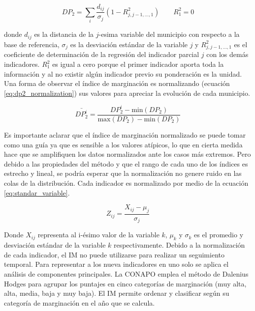 \begin{equation}
    DP_2 =  \sum_{i} \frac{d_{ij}}{\sigma_j} (1-R_{j,j-1,\dots,1}^2) \qquad R_1^2=0
    \label{eq:dp2_definition}
\end{equation}

donde $d_{ij}$ es la distancia de la $j$-esima variable del municipio con respecto a la base de referencia, $\sigma_j$ es la desviación estándar de la variable $j$ y $R_{j,j-1,\dots,1}^2$ es el coeficiente de determinación de la regresión del indicador parcial $j$ con los demás indicadores. $R_1^2$ es igual a cero porque el primer indicador aporta toda la información y al no existir algún indicador previo su ponderación es la unidad. Una forma de observar el índice de marginación es normalizando (ecuación \ref{eq:dp2_normalization}) sus valores para apreciar la evolución de cada municipio\cite{Somarriba_2013}.

\begin{equation}
    \bar{DP_2^i} = \frac{DP_2^i-\text{min}(DP_2)}{\text{max}(DP_2)-\text{min}(DP_2)}
    \label{eq:dp2_normalization}
\end{equation}

Es importante aclarar que el índice de marginación normalizado se puede tomar como una guía ya que es sensible a los valores atípicos, lo que en cierta medida hace que se amplifiquen los datos normalizados ante los casos más extremos. Pero debido a las propiedades del método y que el rango de cada uno de los índices es estrecho y lineal, se podría esperar que la normalización no genere ruido en las colas de la distribución. Cada indicador es normalizado por medio de la ecuación \ref{eq:standar_variable}.

\begin{equation}
    Z_{ij} = \frac{X_{ij}-\mu_j}{\sigma_j} \label{eq:standar_variable}
\end{equation}

Donde $X_{ij}$ representa al i-ésimo valor de la variable $k$, $\mu_k$ y $\sigma_k$ es el promedio y desviación estándar de la variable $k$ respectivamente. Debido a la normalización de cada indicador, el IM no puede utilizarse para realizar un seguimiento temporal. Para representar a los nueva indicadores en uno solo se aplica el análisis de componentes principales. La CONAPO emplea el método de Dalenius Hodges\cite{Dalenius_1959} para agrupar los puntajes en cinco categorías de marginación (muy alta, alta, media, baja y muy baja). El IM permite ordenar y clasificar según su categoría de marginación en el año que se calcula.

